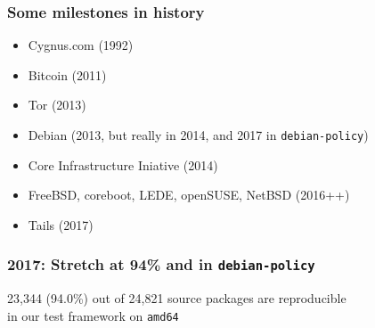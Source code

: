 \documentclass[14pt,aspectratio=169]{beamer}
\newif\ifplacelogo
\begin{document}
\begin{frame}
 \frametitle{Some milestones in history}
 \begin{itemize}
\item<7> Cygnus.com (1992)
\item Bitcoin (2011)
\item<2-7> Tor (2013)
\item<3-7> Debian (2013, but really in 2014, and 2017 in \texttt{debian-policy})
\item<4-7> Core Infrastructure Iniative (2014)
\item<5-7> FreeBSD, coreboot, LEDE, openSUSE, NetBSD (2016++)
\item<6-7> Tails (2017)
 \end{itemize}
\end{frame}

\placelogotrue

\begin{frame}
 \frametitle{2017: Stretch at 94\% and in \texttt{debian-policy}}
 \begin{center}
  \footnotesize{23,344 (94.0\%) out of 24,821 source packages are reproducible \\
    in our test framework on \texttt{amd64}}
  \vfill
 \end{center}
\end{frame}

\placelogotrue
\end{document}
